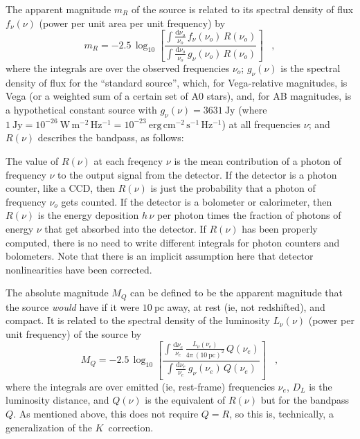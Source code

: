 \documentclass[preprint]{aastex}
\newcommand{\kcorrection}{$K$~correction}
\newcommand{\nuobs}{\nu_o}
\newcommand{\nuemit}{\nu_e}
\begin{document}
The apparent magnitude $m_R$ of the source is related to its spectral
density of flux $f_{\nu}(\nu)$ (power per unit area per unit
frequency) by
\begin{equation}
m_R = -2.5\,\log_{10}\left[
  \frac{\displaystyle
          \int\frac{\mathrm{d}\nuobs}{\nuobs}\,f_{\nu}(\nuobs)\,R(\nuobs)}
       {\displaystyle
          \int\frac{\mathrm{d}\nuobs}{\nuobs}\,g_{\nu}(\nuobs)\,R(\nuobs)}
\right] \;\;\;,
\end{equation}
where the integrals are over the observed frequencies $\nuobs$;
$g_{\nu}(\nu)$ is the spectral density of flux for the ``standard
source'', which, for Vega-relative magnitudes, is Vega (or a weighted
sum of a certain set of A0 stars), and, for AB magnitudes, is a
hypothetical constant source with $g_{\nu}(\nu)=3631~\mathrm{Jy}$
(where $1~\mathrm{Jy}= 10^{-26}~\mathrm{W\,m^{-2}\,Hz^{-1}}=
10^{-23}~\mathrm{erg\,cm^{-2}\,s^{-1}\,Hz^{-1}}$) at all frequencies
$\nu$; and $R(\nu)$ describes the bandpass, as follows:

The value of $R(\nu)$ at each freqency $\nu$ is the mean contribution
of a photon of frequency $\nu$ to the output signal from the detector.
If the detector is a photon counter, like a CCD, then $R(\nu)$ is just
the probability that a photon of frequency $\nuobs$ gets counted.  If
the detector is a bolometer or calorimeter, then $R(\nu)$ is the
energy deposition $h\,\nu$ per photon times the fraction of photons of
energy $\nu$ that get absorbed into the detector.  If $R(\nu)$ has
been properly computed, there is no need to write different integrals
for photon counters and bolometers.  Note that there is an implicit
assumption here that detector nonlinearities have been corrected.

The absolute magnitude $M_Q$ can be defined to be the apparent
magnitude that the source \emph{would} have if it were
$10~\mathrm{pc}$ away, at rest (ie, not redshifted), and compact.  It
is related to the spectral density of the luminosity $L_{\nu}(\nu)$
(power per unit frequency) of the source by
\begin{equation}
M_Q = -2.5\,\log_{10}\left[
  \frac{\displaystyle
          \int\frac{\mathrm{d}\nuemit}{\nuemit}\,
              \frac{L_{\nu}(\nuemit)}{4\pi\,(10~\mathrm{pc})^2}\,Q(\nuemit)}
       {\displaystyle
          \int\frac{\mathrm{d}\nuemit}{\nuemit}\,g_{\nu}(\nuemit)\,Q(\nuemit)}
\right] \;\;\;,
\end{equation}
where the integrals are over emitted (ie, rest-frame) frequencies
$\nuemit$, $D_L$ is the luminosity distance, and $Q(\nu)$ is the
equivalent of $R(\nu)$ but for the bandpass $Q$.  As mentioned above,
this does not require $Q=R$, so this is, technically, a generalization
of the \kcorrection.
\end{document}
